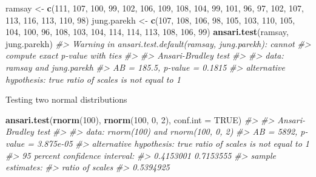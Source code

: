 \documentclass[
]{book}
\newenvironment{Shaded}{\begin{snugshade}}{\end{snugshade}}
\newcommand{\AttributeTok}[1]{\textcolor[rgb]{0.13,0.29,0.53}{#1}}
\newcommand{\CommentTok}[1]{\textcolor[rgb]{0.56,0.35,0.01}{\textit{#1}}}
\newcommand{\ConstantTok}[1]{\textcolor[rgb]{0.56,0.35,0.01}{#1}}
\newcommand{\DecValTok}[1]{\textcolor[rgb]{0.00,0.00,0.81}{#1}}
\newcommand{\FunctionTok}[1]{\textcolor[rgb]{0.13,0.29,0.53}{\textbf{#1}}}
\newcommand{\NormalTok}[1]{#1}
\newcommand{\OtherTok}[1]{\textcolor[rgb]{0.56,0.35,0.01}{#1}}
\begin{document}
\begin{Shaded}
\begin{Highlighting}[]
\NormalTok{ramsay }\OtherTok{\textless{}{-}} \FunctionTok{c}\NormalTok{(}\DecValTok{111}\NormalTok{, }\DecValTok{107}\NormalTok{, }\DecValTok{100}\NormalTok{, }\DecValTok{99}\NormalTok{, }\DecValTok{102}\NormalTok{, }\DecValTok{106}\NormalTok{, }\DecValTok{109}\NormalTok{, }\DecValTok{108}\NormalTok{, }\DecValTok{104}\NormalTok{, }\DecValTok{99}\NormalTok{,}
            \DecValTok{101}\NormalTok{, }\DecValTok{96}\NormalTok{, }\DecValTok{97}\NormalTok{, }\DecValTok{102}\NormalTok{, }\DecValTok{107}\NormalTok{, }\DecValTok{113}\NormalTok{, }\DecValTok{116}\NormalTok{, }\DecValTok{113}\NormalTok{, }\DecValTok{110}\NormalTok{, }\DecValTok{98}\NormalTok{)}
\NormalTok{jung.parekh }\OtherTok{\textless{}{-}} \FunctionTok{c}\NormalTok{(}\DecValTok{107}\NormalTok{, }\DecValTok{108}\NormalTok{, }\DecValTok{106}\NormalTok{, }\DecValTok{98}\NormalTok{, }\DecValTok{105}\NormalTok{, }\DecValTok{103}\NormalTok{, }\DecValTok{110}\NormalTok{, }\DecValTok{105}\NormalTok{, }\DecValTok{104}\NormalTok{,}
            \DecValTok{100}\NormalTok{, }\DecValTok{96}\NormalTok{, }\DecValTok{108}\NormalTok{, }\DecValTok{103}\NormalTok{, }\DecValTok{104}\NormalTok{, }\DecValTok{114}\NormalTok{, }\DecValTok{114}\NormalTok{, }\DecValTok{113}\NormalTok{, }\DecValTok{108}\NormalTok{, }\DecValTok{106}\NormalTok{, }\DecValTok{99}\NormalTok{)}
\FunctionTok{ansari.test}\NormalTok{(ramsay, jung.parekh)}
\CommentTok{\#\textgreater{} Warning in ansari.test.default(ramsay, jung.parekh): cannot}
\CommentTok{\#\textgreater{} compute exact p{-}value with ties}
\CommentTok{\#\textgreater{} }
\CommentTok{\#\textgreater{}  Ansari{-}Bradley test}
\CommentTok{\#\textgreater{} }
\CommentTok{\#\textgreater{} data:  ramsay and jung.parekh}
\CommentTok{\#\textgreater{} AB = 185.5, p{-}value = 0.1815}
\CommentTok{\#\textgreater{} alternative hypothesis: true ratio of scales is not equal to 1}
\end{Highlighting}
\end{Shaded}

Testing two normal distributions

\begin{Shaded}
\begin{Highlighting}[]
\FunctionTok{ansari.test}\NormalTok{(}\FunctionTok{rnorm}\NormalTok{(}\DecValTok{100}\NormalTok{), }\FunctionTok{rnorm}\NormalTok{(}\DecValTok{100}\NormalTok{, }\DecValTok{0}\NormalTok{, }\DecValTok{2}\NormalTok{), }\AttributeTok{conf.int =} \ConstantTok{TRUE}\NormalTok{)}
\CommentTok{\#\textgreater{} }
\CommentTok{\#\textgreater{}  Ansari{-}Bradley test}
\CommentTok{\#\textgreater{} }
\CommentTok{\#\textgreater{} data:  rnorm(100) and rnorm(100, 0, 2)}
\CommentTok{\#\textgreater{} AB = 5892, p{-}value = 3.875e{-}05}
\CommentTok{\#\textgreater{} alternative hypothesis: true ratio of scales is not equal to 1}
\CommentTok{\#\textgreater{} 95 percent confidence interval:}
\CommentTok{\#\textgreater{}  0.4153001 0.7153555}
\CommentTok{\#\textgreater{} sample estimates:}
\CommentTok{\#\textgreater{} ratio of scales }
\CommentTok{\#\textgreater{}       0.5394925}
\end{Highlighting}
\end{Shaded}
\end{document}
